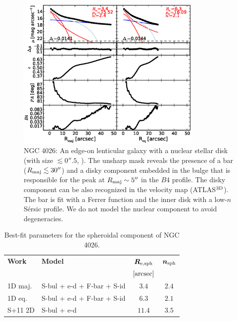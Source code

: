 \documentclass[preprint2]{emulateapj}
\newcommand{\fitfigurewidth}{0.8\textwidth}
\begin{document}
  \begin{figure}[h]
  \begin{center}
  \includegraphics[width=\fitfigurewidth]{n4026_1Dfit.eps}
  \caption{NGC 4026: 
  An edge-on lenticular galaxy with a nuclear stellar disk (with size $\lesssim 0''.5$, \citealt{ledo2010}).
  The unsharp mask reveals the presence of a bar ($R_{\rm maj} \lesssim 30''$) and a disky component 
  embedded in the bulge that is responsible for the peak at $R_{\rm maj} \sim 5''$ in the $B4$ profile.
  The disky component can be also recognized in the velocity map (ATLAS$^{\rm 3D}$).
  The bar is fit with a Ferrer function and the inner disk with a low-$n$ S\'ersic profile.
  We do not model the nuclear component to avoid degeneracies.
  }
  \end{center}
  \end{figure}

  \begin{table}[h]
  \small
  \caption{Best-fit parameters for the spheroidal component of NGC 4026.}
  \begin{center}
  \begin{tabular}{llcc}
  \hline
  {\bf Work} & {\bf Model}   & $\bm R_{\rm e,sph}$    & $\bm n_{\rm sph}$ \\
    &  &  $[\rm arcsec]$ & \\
  \hline
  1D maj. & S-bul + e-d + F-bar + S-id & $3.4$  &  $2.4$ \\
  1D eq.  & S-bul + e-d + F-bar + S-id & $6.3$  &  $2.1$ \\
  \hline
  S+11 2D         & S-bul + e-d & $11.4$  &  $3.5$ \\
  \hline
  \end{tabular}
  \end{center}
  \label{tab:n4026}
  \end{table}
\end{document}
